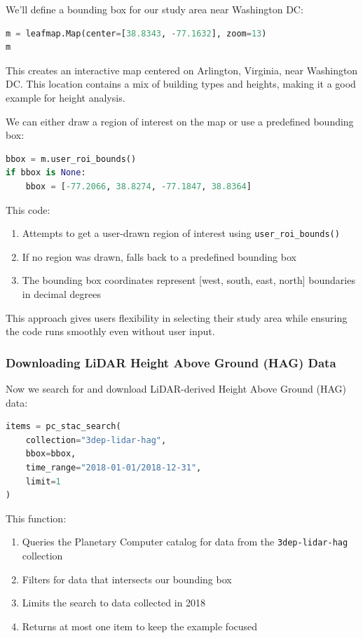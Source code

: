 We'll define a bounding box for our study area near Washington DC:

\begin{lstlisting}[language=Python]
m = leafmap.Map(center=[38.8343, -77.1632], zoom=13)
m
\end{lstlisting}

This creates an interactive map centered on Arlington, Virginia, near Washington DC. This location contains a mix of building types and heights, making it a good example for height analysis.

We can either draw a region of interest on the map or use a predefined bounding box:

\begin{lstlisting}[language=Python]
bbox = m.user_roi_bounds()
if bbox is None:
    bbox = [-77.2066, 38.8274, -77.1847, 38.8364]
\end{lstlisting}

This code:

\begin{enumerate}
\item Attempts to get a user-drawn region of interest using \texttt{user\_roi\_bounds()}
\item If no region was drawn, falls back to a predefined bounding box
\item The bounding box coordinates represent [west, south, east, north] boundaries in decimal degrees
\end{enumerate}

This approach gives users flexibility in selecting their study area while ensuring the code runs smoothly even without user input.

\subsubsection{Downloading LiDAR Height Above Ground (HAG) Data}

Now we search for and download LiDAR-derived Height Above Ground (HAG) data:

\begin{lstlisting}[language=Python]
items = pc_stac_search(
    collection="3dep-lidar-hag",
    bbox=bbox,
    time_range="2018-01-01/2018-12-31",
    limit=1
)
\end{lstlisting}

This function:

\begin{enumerate}
\item Queries the Planetary Computer catalog for data from the \texttt{3dep-lidar-hag} collection
\item Filters for data that intersects our bounding box
\item Limits the search to data collected in 2018
\item Returns at most one item to keep the example focused
\end{enumerate}

